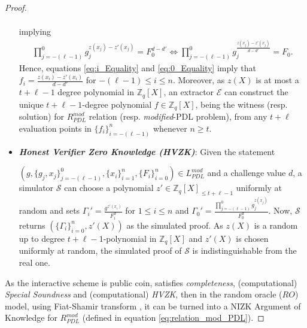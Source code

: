 \begin{proof}
\begin{itemize}
\begin{align*}
      \end{align*}
      implying
      \begin{align}\label{eq:0_Equality}
        \prod_{j=-(\ell-1)}^{0}g_j^{z(x_j)-z'(x_j)}=F_0^{d-d'} \iff \prod_{j=-(\ell-1)}^{0}g_j^{\frac{z(x_j)-z'(x_j)}{d-d'}}=F_0.
      \end{align}
      Hence, equations \ref{eq:i_Equality} and \ref{eq:0_Equality} imply that $f_i=\frac{z(x_i)-z'(x_i)}{d-d'}$ for 
      $-(\ell-1)\leq i\leq n$. Moreover, as $z(X)$ is at most a $t+\ell-1$ degree 
      polynomial in $\mathbb{Z}_q[X]$, an extractor $\mathcal{E}$ can construct the unique $t+\ell-1$-degree 
      polynomial $f\in\mathbb{Z}_q[X]$, being the witness (resp. solution) for $R_{PDL}^{mod}$ relation (resp. \textit{modified}-PDL problem), 
      from any $t+\ell$ evaluation points in $\{f_i\}_{i=-(\ell-1)}^n$ whenever $n\geq t$.
    \item \textit{\textbf{Honest Verifier Zero Knowledge (HVZK)}}: Given the statement\par $(g,\{g_j,x_j\}_{j=-(\ell-1)}^0,\{x_i\}_{i=1}^n,\{F_i\}_{i=0}^n)\in L_{PDL}^{mod}$  
      and a challenge value $d$, a simulator $\mathcal{S}$ can choose a polynomial $z'\in\mathbb{Z}_q[X]_{\leq t+\ell-1}$ uniformly 
      at random and sets $\Gamma_i'=\frac{g^{z'(x_i)}}{F_i^d}$ for $1\leq i\leq n$ and $\Gamma_0'=\frac{\prod_{j=-(\ell-1)}^{0}g_j^{z(x_j)}}{F_0^d}$. 
      Now, $\mathcal{S}$ returns $(\{\Gamma_i\}_{i=0}^n,z'(X))$ as the simulated proof. As $z(X)$ is a random 
      up to degree $t+\ell-1$-polynomial in $\mathbb{Z}_q[X]$ and $z'(X)$ is chosen uniformly at random, 
      the simulated proof of $\mathcal{S}$ is indistinguishable from the real one.
  \end{itemize}
  As the interactive scheme is public coin, satisfies \textit{completeness}, (computational) \textit{Special Soundness} 
  and (computational) \textit{HVZK}, then in the random oracle ($RO$) model, using Fiat-Shamir transform \cite{10.1007/3-540-47721-7_12}, 
  it can be turned into a NIZK Argument of Knowledge for $R_{PDL}^{mod}$ (defined in equation \ref{eq:relation_mod_PDL}).
\end{proof}


